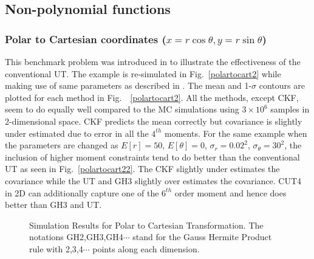 \documentclass[letterpaper, 10 pt, conference]{IEEEtran}  %
\begin{document}
\subsection{Non-polynomial functions}

\subsubsection{Polar to Cartesian coordinates ($x=r\cos\theta, y=r\sin\theta$)}
This benchmark problem was introduced in \cite{jul2} to illustrate the effectiveness of the conventional UT. The example is re-simulated in Fig.~\ref{polartocart2} while making use of same parameters as described in \cite{jul2}. The mean and 1-$\sigma$ contours are plotted for each method in Fig.~~\ref{polartocart2}.  All the methods, except CKF, seem to do equally well compared to the MC simulations using $3\times10^6$ samples in 2-dimensional space. CKF predicts the mean correctly but covariance is slightly under estimated due to error in all the $4^{th}$ moments. For the same example when the parameters are changed as $E[r]=50$, $E[\theta]=0$, $\sigma_r=0.02^2$, $\sigma_{\theta}=30^2$, the inclusion of higher moment constraints tend to do better than the conventional UT as seen in Fig.~\ref{polartocart22}. The CKF slightly under estimates the covariance while the UT and GH3 slightly over estimates the covariance. CUT4 in 2D can additionally capture one of the $6^{th}$ order moment and hence does better than GH3 and UT.
      \begin{figure}
      \centering
      \caption{Simulation Results for Polar to Cartesian Transformation. The notations GH2,GH3,GH4$\cdots$ stand for the Gauss Hermite Product rule with 2,3,4$\cdots$ points along each dimension. }
      \label{polartocart4}\vspace{-0.2in}
   \end{figure} 
   
\end{document}

